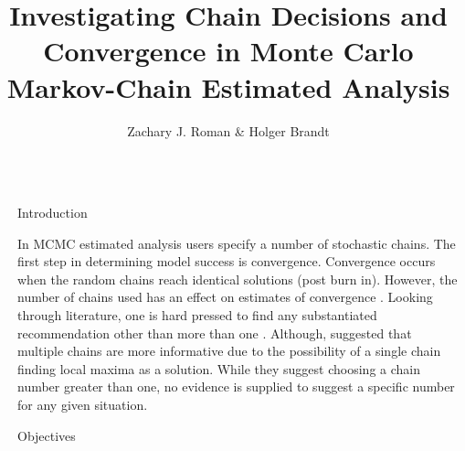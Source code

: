 \documentclass[final,hyperref={pdfpagelabels=false}]{beamer}
\title{\huge Investigating Chain Decisions and Convergence in Monte Carlo Markov-Chain Estimated Analysis} %
\author{Zachary J. Roman \& Holger Brandt} %
\institute{University of Kansas Psychology Department} %
\begin{document}

\begin{frame}[t] %

\begin{columns}[t] %

\begin{column}{.02\textwidth}\end{column} %

\begin{column}{.465\textwidth} %


\begin{block}{Introduction}

\begin{itemize}
\small{\item In MCMC estimated analysis users specify a number of stochastic chains. The first step in determining model success is convergence. Convergence occurs when the random chains reach identical solutions (post burn in). However, the number of chains used has an effect on estimates of convergence \cite{gelman2011inference}. Looking through literature, one is hard pressed to find any substantiated recommendation other than more  than one \cite{gelman2011inference}. Although, \cite{gilks1996introducing} suggested that multiple chains are more informative due to the possibility of a single chain finding local maxima as a solution. While they suggest choosing a chain number greater than one, no evidence is supplied to suggest a specific number for any given situation.}
\end{itemize}

\end{block}

            
\begin{block}{Objectives}


\end{block}
\end{column}
\end{columns}
\end{frame}
\end{document}

